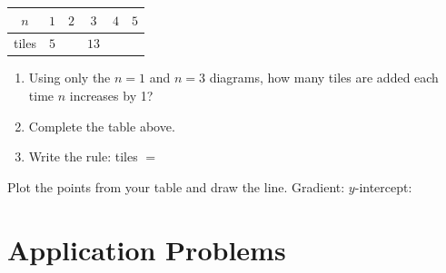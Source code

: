 \documentclass[11pt]{article}
\newcommand{\ans}{\hrulefill}
\newcommand{\gridaxis}[6]{%
  \begin{axis}[
    width=7.4cm, height=6.4cm,
    xmin=#1, xmax=#2, ymin=#3, ymax=#4,
    grid=both, grid style={line width=.1pt, draw=gray!35},
    axis lines=middle,
    xlabel={$x$}, ylabel={$y$},
    xtick distance=#5, ytick distance=#6,
    tick label style={font=\tiny},
    label style={font=\small},
    xlabel style={at={(axis description cs:1,0)}, anchor=north west},
    ylabel style={at={(axis description cs:0,1)}, anchor=south east},
    axis line style={-{Latex[length=1.8mm]}},
  ]
}
\begin{document}
\vspace{0.6em}
\begin{center}
\begin{tabular}{|c|c|c|c|c|c|}
\hline
$n$ & $1$ & $2$ & $3$ & $4$ & $5$ \\\hline
tiles & $5$ & & $13$ & & \\\hline
\end{tabular}
\end{center}

\begin{enumerate}
  \item[(a)] Using only the $n=1$ and $n=3$ diagrams, how many tiles are added each time $n$ increases by 1? \ans
  \item[(b)] Complete the table above.
  \item[(c)] Write the rule: tiles $=$ \ans
\end{enumerate}

\begin{center}
\end{center}

\noindent Plot the points from your table and draw the line. Gradient: \ans \qquad $y$-intercept: \ans

\section{Application Problems}
\end{document}
